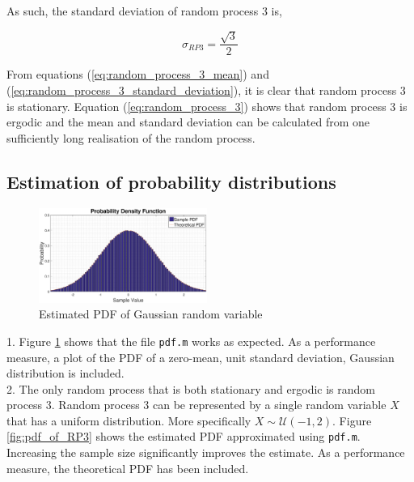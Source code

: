 \documentclass{article}
\begin{document}
As such, the standard deviation of random process 3 is,

\begin{equation}
    \sigma_{RP3} = \frac{\sqrt{3}}{2} \label{eq:random_process_3_standard_deviation}
\end{equation}

From equations (\ref{eq:random_process_3_mean}) and (\ref{eq:random_process_3_standard_deviation}), it is clear that random process 3 is stationary. Equation (\ref{eq:random_process_3}) shows that random process 3 is ergodic and the mean and standard deviation can be calculated from one sufficiently long realisation of the random process.

\subsection{Estimation of probability distributions}\label{sec:pdf_m}

\begin{figure}[H]
\centering{}
\includegraphics[width=0.49\textwidth]{probability_density_function}
\caption{Estimated PDF of Gaussian random variable}
\label{fig:estimation_of_gaussian}
\end{figure}

1. Figure \ref{fig:estimation_of_gaussian} shows that the file {\tt pdf.m} works as expected. As a performance measure, a plot of the PDF of a zero-mean, unit standard deviation, Gaussian distribution is included.\\

2. The only random process that is both stationary and ergodic is random process 3. Random process 3 can be represented by a single random variable $X$ that has a uniform distribution. More specifically $X\sim \mathcal{U}(-1,2)$. Figure \ref{fig:pdf_of_RP3} shows the estimated PDF approximated using {\tt pdf.m}. Increasing the sample size significantly improves the estimate. As a performance measure, the theoretical PDF has been included.
\end{document}
